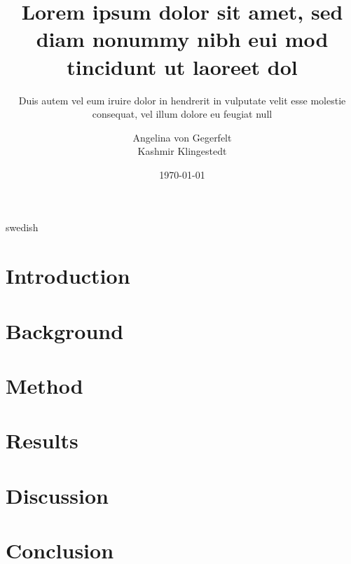 \documentclass[a4paper,12pt]{kth-mag}
\title{Lorem ipsum dolor sit amet, sed diam nonummy nibh eui
       mod tincidunt ut laoreet dol}
\subtitle{Duis autem vel eum iruire dolor in hendrerit in
          vulputate velit esse molestie consequat, vel illum
          dolore eu feugiat null}
\author{Angelina von Gegerfelt\\Kashmir Klingestedt}
\date{\today}
\begin{document}
\frontmatter
\pagestyle{empty}
\removepagenumbers
\maketitle
{}

\begin{abstract}
\end{abstract}

\begin{foreignabstract}{swedish}
\end{foreignabstract}
\newpage

\tableofcontents*
\mainmatter
\pagestyle{newchap}

\chapter{Introduction}


\chapter{Background}


\chapter{Method}


\chapter{Results}


\chapter{Discussion}


\chapter{Conclusion}


\newpage


\appendix
\end{document}
